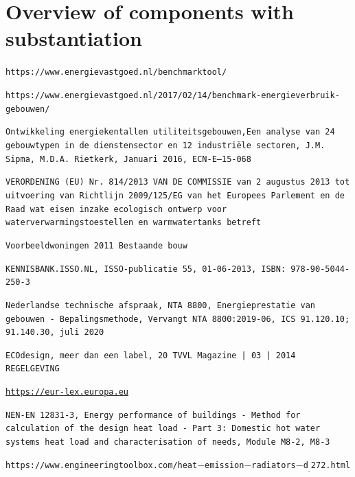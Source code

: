 \documentclass[a4paper,10pt]{article}
\begin{document}


\section{Overview of components with substantiation}






\medskip

\begin{thebibliography}{9}


\texttt{https://www.energievastgoed.nl/benchmarktool/}


\texttt{https://www.energievastgoed.nl/2017/02/14/benchmark-energieverbruik-gebouwen/}



\texttt{Ontwikkeling energiekentallen utiliteitsgebouwen,Een analyse van 24 gebouwtypen in de dienstensector en 12 industriële sectoren, J.M. Sipma, M.D.A. Rietkerk, Januari 2016, ECN-E--15-068}



\texttt{VERORDENING (EU) Nr. 814/2013 VAN DE COMMISSIE
van 2 augustus 2013
tot uitvoering van Richtlijn 2009/125/EG van het Europees Parlement en de Raad wat eisen inzake
ecologisch ontwerp voor waterverwarmingstoestellen en warmwatertanks betreft}



\texttt{Voorbeeldwoningen 2011 Bestaande bouw}


\texttt{KENNISBANK.ISSO.NL, ISSO-publicatie 55,  01-06-2013, ISBN: 978-90-5044-250-3}


\texttt{Nederlandse technische afspraak, NTA 8800, Energieprestatie van gebouwen - Bepalingsmethode, Vervangt NTA 8800:2019-06, ICS 91.120.10; 91.140.30, juli 2020}



\texttt{ECOdesign, meer dan een
label, 20 TVVL Magazine | 03 | 2014 REGELGEVING}



\texttt{\href{https://eur-lex.europa.eu/legal-content/NL/TXT/HTML/?uri=CELEX:32013R0812&from=EN}{https://eur-lex.europa.eu}}



\texttt{NEN-EN 12831-3, Energy performance of buildings - Method for
calculation of the design heat load - Part 3:
Domestic hot water systems heat load and
characterisation of needs, Module M8-2, M8-3}

\texttt{https://www.engineeringtoolbox.com/heat$-$emission$-$radiators$-$d$_{\_}$272.html}


\end{thebibliography}
\end{document}
